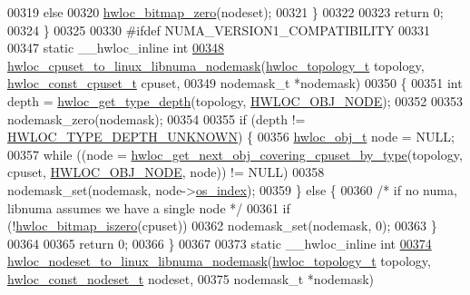 \begin{DoxyCode}
00319     \textcolor{keywordflow}{else}
00320       \hyperlink{a00065_ga6c540b9fe63b8223b6aba46d56dd63b8}{hwloc_bitmap_zero}(nodeset);
00321   \}
00322 
00323   \textcolor{keywordflow}{return} 0;
00324 \}
00325 
00330 \textcolor{preprocessor}{#ifdef NUMA\_VERSION1\_COMPATIBILITY}
00331 \textcolor{preprocessor}{}
00347 \textcolor{keyword}{static} \_\_hwloc\_inline \textcolor{keywordtype}{int}
\hypertarget{a00034_source_l00348}{}\hyperlink{a00070_ga36feb81315de87ce11d9a5aa2b4c6e6d}{00348} \hyperlink{a00070_ga36feb81315de87ce11d9a5aa2b4c6e6d}{hwloc_cpuset_to_linux_libnuma_nodemask}(\hyperlink{a00039_ga9d1e76ee15a7dee158b786c30b6a6e38}{hwloc_topology_t} topology, 
      \hyperlink{a00040_ga1f784433e9b606261f62d1134f6a3b25}{hwloc_const_cpuset_t} cpuset,
00349                                       nodemask\_t *nodemask)
00350 \{
00351   \textcolor{keywordtype}{int} depth = \hyperlink{a00046_gaea7c64dd59467f5201ba87712710b14d}{hwloc_get_type_depth}(topology, \hyperlink{a00041_ggacd37bb612667dc437d66bfb175a8dc55aaf0964881117bdedf1a5e9332cd120dd}{HWLOC_OBJ_NODE});
00352 
00353   nodemask\_zero(nodemask);
00354 
00355   \textcolor{keywordflow}{if} (depth != \hyperlink{a00046_ggaf4e663cf42bbe20756b849c6293ef575a0565ab92ab72cb0cec91e23003294aad}{HWLOC_TYPE_DEPTH_UNKNOWN}) \{
00356     \hyperlink{a00016}{hwloc_obj_t} node = NULL;
00357     \textcolor{keywordflow}{while} ((node = \hyperlink{a00056_ga5915ea30f326676b3a4cfff371ce04d1}{hwloc_get_next_obj_covering_cpuset_by_type}(topology, cpuset, 
      \hyperlink{a00041_ggacd37bb612667dc437d66bfb175a8dc55aaf0964881117bdedf1a5e9332cd120dd}{HWLOC_OBJ_NODE}, node)) != NULL)
00358       nodemask\_set(nodemask, node->\hyperlink{a00016_a61a7a80a68eaccbaaa28269e678c81a9}{os_index});
00359   \} \textcolor{keywordflow}{else} \{
00360     \textcolor{comment}{/* if no numa, libnuma assumes we have a single node */}
00361     \textcolor{keywordflow}{if} (!\hyperlink{a00065_gaa94fed35d2a598bc4a8657b6955b7bf5}{hwloc_bitmap_iszero}(cpuset))
00362       nodemask\_set(nodemask, 0);
00363   \}
00364 
00365   \textcolor{keywordflow}{return} 0;
00366 \}
00367 
00373 \textcolor{keyword}{static} \_\_hwloc\_inline \textcolor{keywordtype}{int}
\hypertarget{a00034_source_l00374}{}\hyperlink{a00070_gafa4e7cc68f0f99724f8d99541d9ab3de}{00374} \hyperlink{a00070_gafa4e7cc68f0f99724f8d99541d9ab3de}{hwloc_nodeset_to_linux_libnuma_nodemask}(\hyperlink{a00039_ga9d1e76ee15a7dee158b786c30b6a6e38}{hwloc_topology_t} topology, 
      \hyperlink{a00040_ga2f5276235841ad66a79bedad16a5a10c}{hwloc_const_nodeset_t} nodeset,
00375                                         nodemask\_t *nodemask)

\end{DoxyCode}
